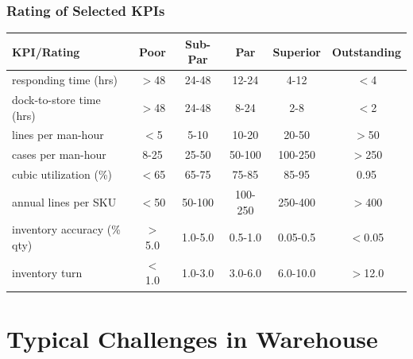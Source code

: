 \documentclass[10pt,handout,notes=show]{beamer}
\begin{document}
\begin{frame}
  \frametitle{Rating of Selected KPIs}


  \begin{center}\small{
  \begin{tabular}{lccccc}\hline
    KPI/Rating 	                 &Poor 	  &Sub-Par 	&Par 	&Superior 	&Outstanding \\ \hline
    responding time (hrs) 	     &$>$48 	&24-48 	  &12-24	  &4-12	   &$<$4  \\
    dock-to-store time (hrs) 	   &$>$48 	&24-48 	  &8-24 	  &2-8	   &$<$2 \\
    lines per man-hour 	         &$<$5 	  &5-10	    &10-20	  &20-50 	 &$>$50 \\
    cases per man-hour 	         &8-25	  &25-50 	  &50-100 	&100-250 	&$>$250 \\
    cubic utilization (\%) 	     &$<$65   &65-75 	  &75-85 	  &85-95 	  &0.95 \\
    annual lines per SKU 	       &$<$50 	&50-100	  &100-250 	&250-400	&$>$400 \\
    inventory accuracy (\% qty)  &$>$5.0 	&1.0-5.0 	&0.5-1.0 	&0.05-0.5	 &$<$0.05 \\
    inventory turn 	             &$<$1.0 	&1.0-3.0 	&3.0-6.0 	&6.0-10.0  &$>$12.0 \\ \hline
  \end{tabular} }
  \end{center}




  \end{frame}

\section[Challenges]{Typical Challenges in Warehouse}
\end{document}
